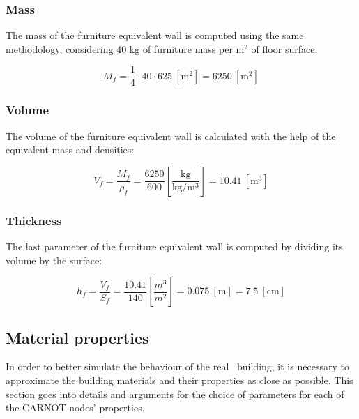 \subsubsection*{Mass}

The mass of the furniture equivalent wall is computed using the same
methodology, considering 40 kg of furniture mass per $\text{m}^2$ of floor
surface.

\begin{equation}
    M_f = \frac{1}{4} \cdot 40 \cdot 625\ \left[\text{m}^2\right] = 6250\
    \left[\text{m}^2\right]
\end{equation}

\subsubsection*{Volume}

The volume of the furniture equivalent wall is calculated with the help of the
equivalent mass and densities:

\begin{equation}
    V_f = \frac{M_f}{\rho_f} = \frac{6250}{600}
    \left[\frac{\text{kg}}{\text{kg}/\text{m}^3}\right]
    = 10.41\ \left[\text{m}^3\right]
\end{equation}

\subsubsection*{Thickness}

The last parameter of the furniture equivalent wall is computed by dividing its
volume by the surface:

\begin{equation}
    h_f = \frac{V_f}{S_f} = \frac{10.41}{140} \left[\frac{m^3}{m^2}\right] =
    0.075\ \left[\text{m}\right] = 7.5\ \left[\text{cm}\right]
\end{equation}


\subsection{Material properties}

In order to better simulate the behaviour of the real \pdome\ building, it is
necessary to approximate the building materials and their properties as close as
possible. This section goes into details and arguments for the choice of
parameters for each of the CARNOT nodes' properties.

